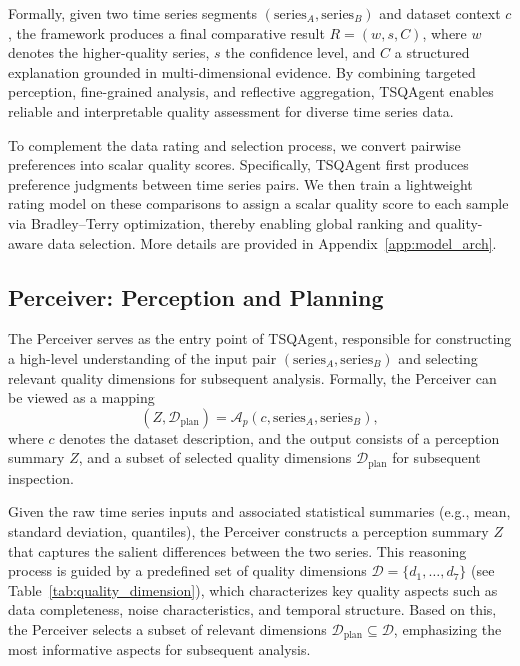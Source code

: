 \documentclass{article}
\begin{document}
Formally, given two time series segments $(\mathrm{series}_A, \mathrm{series}_B)$ and dataset context $c$, the framework produces a final comparative result $R = (w, s, C)$, where $w$ denotes the higher-quality series, $s$ the confidence level, and $C$ a structured explanation grounded in multi-dimensional evidence. By combining targeted perception, fine-grained analysis, and reflective aggregation, TSQAgent enables reliable and interpretable quality assessment for diverse time series data.

To complement the data rating and selection process, we convert pairwise preferences into scalar quality scores. Specifically, TSQAgent first produces preference judgments between time series pairs. We then train a lightweight rating model on these comparisons to assign a scalar quality score to each sample via Bradley--Terry optimization, thereby enabling global ranking and quality-aware data selection.
More details are provided in Appendix~\ref{app:model_arch}.





\subsection{Perceiver: Perception and Planning}

The Perceiver serves as the entry point of TSQAgent, responsible for constructing a high-level understanding of the input pair $(\mathrm{series}_A, \mathrm{series}_B)$ and selecting relevant quality dimensions for subsequent analysis. Formally, the Perceiver can be viewed as a mapping
\begin{equation}
(Z, \mathcal{D}_{\text{plan}}) = \mathcal{A}_p(c, \mathrm{series}_A, \mathrm{series}_B),
\end{equation}
where $c$ denotes the dataset description, and the output consists of a perception summary $Z$, and a subset of selected quality dimensions $\mathcal{D}_{\text{plan}}$ for subsequent inspection.

Given the raw time series inputs and associated statistical summaries (e.g., mean, standard deviation, quantiles), the Perceiver constructs a perception summary $Z$ that captures the salient differences between the two series. This reasoning process is guided by a predefined set of quality dimensions $\mathcal{D} = \{d_1, \ldots, d_7\}$ (see Table~\ref{tab:quality_dimension}), which characterizes key quality aspects such as data completeness, noise characteristics, and temporal structure. Based on this, the Perceiver selects a subset of relevant dimensions $\mathcal{D}_{\text{plan}} \subseteq \mathcal{D}$, emphasizing the most informative aspects for subsequent analysis.
\end{document}
